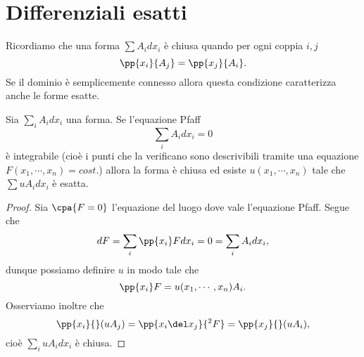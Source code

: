\section{Differenziali esatti}
Ricordiamo che una forma $\sum A_i dx_i$ \`e chiusa quando per ogni coppia $i,j$
\[\pp {x_i}{A_j}=\pp{x_j}{A_i}.\]
Se il dominio \`e semplicemente connesso allora questa condizione caratterizza anche le forme esatte.

\begin{proposition}\label{EsattezzaPfaff}
Sia $\sum_i A_idx_i$ una forma. Se l'equazione Pfaff
\[\sum_i A_idx_i=0\]
\`e integrabile (cio\`e i punti che la verificano sono descrivibili tramite una equazione $F(x_1,\cdots, x_n)=cost.$) allora la forma \`e chiusa ed esiste $u(x_1,\cdots, x_n)$ tale che $\sum uA_i dx_i$ \`e esatta.
\end{proposition}
\begin{proof}
Sia $\cpa{F=0}$ l'equazione del luogo dove vale l'equazione Pfaff. Segue che
\[dF=\sum_i\pp{x_i}F dx_i=0=\sum_i A_idx_i,\]
dunque possiamo definire $u$ in modo tale che
\[\pp{x_i}F=u(x_1,\cdots, x_n)A_i.\]
Osserviamo inoltre che
\[\pp{x_i}{}(uA_j)=\pp{x_i\del x_j}{^2F}=\pp{x_j}{}(uA_i),\]
cio\`e $\sum_i uA_idx_i$ \`e chiusa.
\end{proof}

